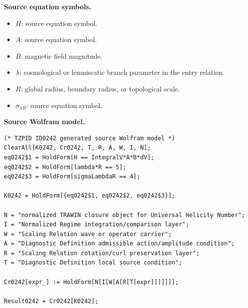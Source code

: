 \begin{minipage}[t]{0.49\linewidth}
\begingroup
\small
\raggedright
\textbf{Source equation symbols.}\par
\begin{itemize}[leftmargin=1.35em,itemsep=1pt,topsep=1pt,parsep=0pt]
    \item $H$: source equation symbol.
    \item $A$: source equation symbol.
    \item $B$: magnetic field magnitude.
    \item $\lambda$: cosmological or lemniscatic branch parameter in the entry relation.
    \item $R$: global radius, boundary radius, or topological scale.
    \item $\sigma_{\lambda R}$: source equation symbol.
\end{itemize}
\endgroup
\end{minipage}\hfill
\begin{minipage}[t]{0.47\linewidth}
\begingroup
\scriptsize
\raggedright
\textbf{Source Wolfram model.}\par
\begin{Verbatim}[fontsize=\tiny,breaklines=true,breakanywhere=true]
(* TZPID ID0242 generated source Wolfram model *)
ClearAll[K0242, Cr0242, T, R, A, W, I, N];
eq0242$1 = HoldForm[H == IntegralV*A*B*dV];
eq0242$2 = HoldForm[lambda*R == 5];
eq0242$3 = HoldForm[sigmaLambdaR == 4];

K0242 = HoldForm[{eq0242$1, eq0242$2, eq0242$3}];

N = "normalized TRAWIN closure object for Universal Helicity Number";
I = "Normalized Regime integration/comparison layer";
W = "Scaling Relation wave or operator carrier";
A = "Diagnostic Definition admissible action/amplitude condition";
R = "Scaling Relation rotation/curl preservation layer";
T = "Diagnostic Definition local source condition";

Cr0242[expr_] := HoldForm[N[I[W[A[R[T[expr]]]]]]];

Result0242 = Cr0242[K0242];
\end{Verbatim}
\endgroup
\end{minipage}


